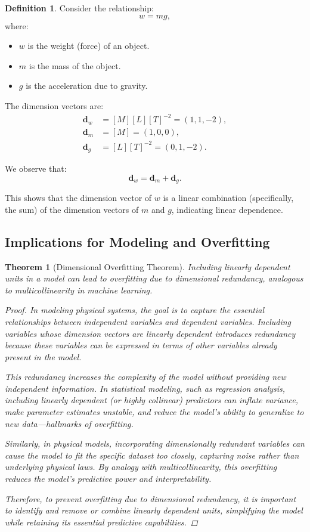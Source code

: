 \documentclass{article}
\newtheorem{theorem}{Theorem}[section]
\theoremstyle{definition}
\newtheorem{definition}{Definition}[section]
\theoremstyle{remark}
\begin{document}
	\begin{definition}
		Consider the relationship:
		\[
		w = m g,
		\]
		where:
		\begin{itemize}
			\item $w$ is the weight (force) of an object.
			\item $m$ is the mass of the object.
			\item $g$ is the acceleration due to gravity.
		\end{itemize}
	\end{definition}
	
	The dimension vectors are:
	\begin{align*}
		\mathbf{d}_w &= [M][L][T]^{-2} = (1,1,-2), \\
		\mathbf{d}_m &= [M] = (1,0,0), \\
		\mathbf{d}_g &= [L][T]^{-2} = (0,1,-2).
	\end{align*}
	
	We observe that:
	\[
	\mathbf{d}_w = \mathbf{d}_m + \mathbf{d}_g.
	\]
	
	This shows that the dimension vector of $w$ is a linear combination (specifically, the sum) of the dimension vectors of $m$ and $g$, indicating linear dependence.
	
	\subsection{Implications for Modeling and Overfitting}
	
	\begin{theorem}[Dimensional Overfitting Theorem]
		Including linearly dependent units in a model can lead to overfitting due to dimensional redundancy, analogous to multicollinearity in machine learning.
		
		\begin{proof}
			In modeling physical systems, the goal is to capture the essential relationships between independent variables and dependent variables. Including variables whose dimension vectors are linearly dependent introduces redundancy because these variables can be expressed in terms of other variables already present in the model.
			
			This redundancy increases the complexity of the model without providing new independent information. In statistical modeling, such as regression analysis, including linearly dependent (or highly collinear) predictors can inflate variance, make parameter estimates unstable, and reduce the model's ability to generalize to new data—hallmarks of overfitting.
			
			Similarly, in physical models, incorporating dimensionally redundant variables can cause the model to fit the specific dataset too closely, capturing noise rather than underlying physical laws. By analogy with multicollinearity, this overfitting reduces the model's predictive power and interpretability.
			
			Therefore, to prevent overfitting due to dimensional redundancy, it is important to identify and remove or combine linearly dependent units, simplifying the model while retaining its essential predictive capabilities.
		\end{proof}
	\end{theorem}
	
\end{document}
